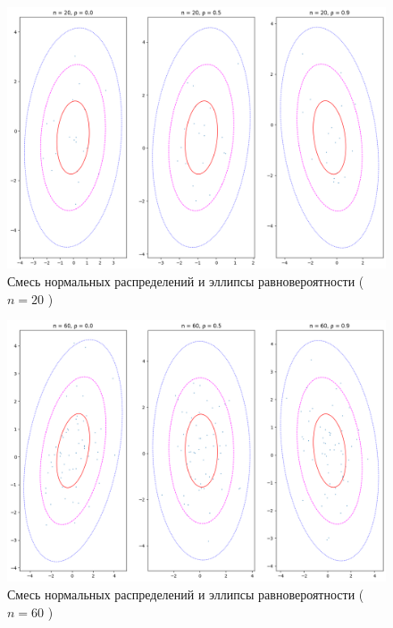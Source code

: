 \documentclass[12pt,a4paper]{article}
\begin{document}
	\begin{figure}[htbp!]
		\begin{center}
			\includegraphics[width = 0.8\linewidth]{graphics/lab5_ellips_20}
			\caption{Смесь нормальных распределений и эллипсы равновероятности
			( \( n = 20 \) )}
		\end{center}
	\end{figure}

	\begin{figure}[htbp!]
		\begin{center}
			\includegraphics[width = 0.8\linewidth]{graphics/lab5_ellips_60}
			\caption{Смесь нормальных распределений и эллипсы равновероятности
			( \( n = 60 \) )}
		\end{center}
	\end{figure}
\end{document}
